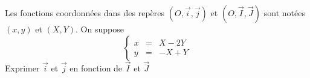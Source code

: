 Les fonctions coordonn{\'e}es dans des rep{\`e}res $(O,\overrightarrow{i}, \overrightarrow{j})$ et $(O,\overrightarrow{I}, \overrightarrow{J})$ sont not{\'e}es $(x,y)$ et $(X,Y)$. On suppose\[\left\lbrace \begin{array}{ccc}
x & = & X-2Y \\ y & = & -X+Y \end{array} \right.\] Exprimer $\overrightarrow{i}$ et $\overrightarrow{j}$ en fonction de $\overrightarrow{I}$ et $\overrightarrow{J}$ \bigskip \bigskip \bigskip